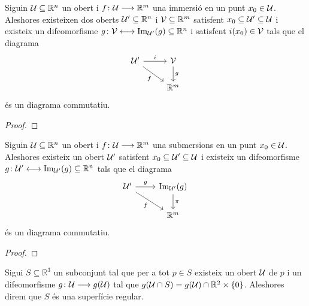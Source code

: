 \documentclass[../Apunts.tex]{subfiles}
\begin{document}
	\begin{theorem}
		\label{thm:Teorema d'estructura local de les immersions}
		Siguin \(\mathcal{U}\subseteq\mathbb{R}^{n}\) un obert i \(f\colon\mathcal{U}\longrightarrow\mathbb{R}^{m}\) una immersió en un punt \(x_{0}\in\mathcal{U}\). Aleshores existeixen dos oberts \(\mathcal{U}'\subseteq\mathbb{R}^{n}\) i \(\mathcal{V}\subseteq\mathbb{R}^{m}\) satisfent \(x_{0}\subseteq\mathcal{U}'\subseteq\mathcal{U}\) i existeix un difeomorfisme \(g\colon\mathcal{V}\longleftrightarrow\operatorname{Im}_{\mathcal{U}'}(g)\subseteq\mathbb{R}^{n}\) i satisfent \(i(x_{0})\in\mathcal{V}\) tals que el diagrama
		\[\begin{tikzcd}
			\obert{U}' \arrow{r}{i} \arrow[swap]{dr}{f} & \obert{V} \arrow{d}{g} \\
			& \mathbb{R}^{m}
		\end{tikzcd}\]
		és un diagrama commutatiu.
		\begin{proof}
		\end{proof}
	\end{theorem}
	\begin{theorem}
		\label{thm:Teorema d'estructura local de les submersions}
		Siguin \(\mathcal{U}\subseteq\mathbb{R}^{n}\) un obert i \(f\colon\mathcal{U}\longrightarrow\mathbb{R}^{m}\) una submersions en un punt \(x_{0}\in\mathcal{U}\). Aleshores existeix un obert \(\mathcal{U}'\) satisfent \(x_{0}\subseteq\mathcal{U}'\subseteq\mathcal{U}\) i existeix un difeomorfisme \(g\colon\mathcal{U}'\longleftrightarrow\operatorname{Im}_{\mathcal{U}'}(g)\subseteq\mathbb{R}^{n}\) tals que el diagrama
		\[\begin{tikzcd}
			\obert{U}' \arrow{r}{g} \arrow[swap]{dr}{f} & \Ima_{\obert{U}'}(g) \arrow{d}{\pi} \\
			& \mathbb{R}^{m}
		\end{tikzcd}\]
		és un diagrama commutatiu.
		\begin{proof}
		\end{proof}
	\end{theorem}
	\begin{definition}[Superfície]
		\label{def:superfície}
		Sigui \(S\subseteq\mathbb{R}^{3}\) un subconjunt tal que per a tot \(p\in S\) existeix un obert \(\mathcal{U}\) de \(p\) i un difeomorfisme \(g\colon\mathcal{U}\longrightarrow g(\mathcal{U})\) tal que \(g(\mathcal{U}\cap S)=g(\mathcal{U})\cap\mathbb{R}^{2}\times\{0\}\). Aleshores direm que \(S\) és una superfície regular.
	\end{definition}
\end{document}
